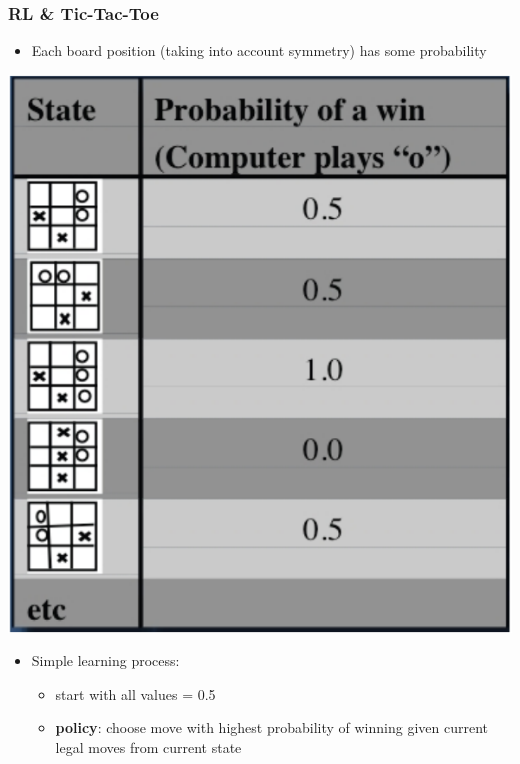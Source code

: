 \documentclass{beamer}
\renewcommand{\high}{\textbf}
\begin{document}
\begin{frame}\frametitle{RL \& Tic-Tac-Toe}\small
\begin{itemize}
\item Each board position (taking into account symmetry) has some probability
\end{itemize}
\begin{minipage}{4cm}
\begin{center}
\includegraphics[width=1.0\linewidth]{Figures/tic_tac} 
\end{center}
\end{minipage}
\begin{minipage}{7cm}
\begin{itemize}
\item Simple learning process: 
\begin{itemize}
\item start with all values = 0.5
\item \high{policy}: choose move with highest probability of winning given current legal moves from current state

\end{itemize}
\end{itemize}
\end{minipage}
\end{frame}
\end{document}
